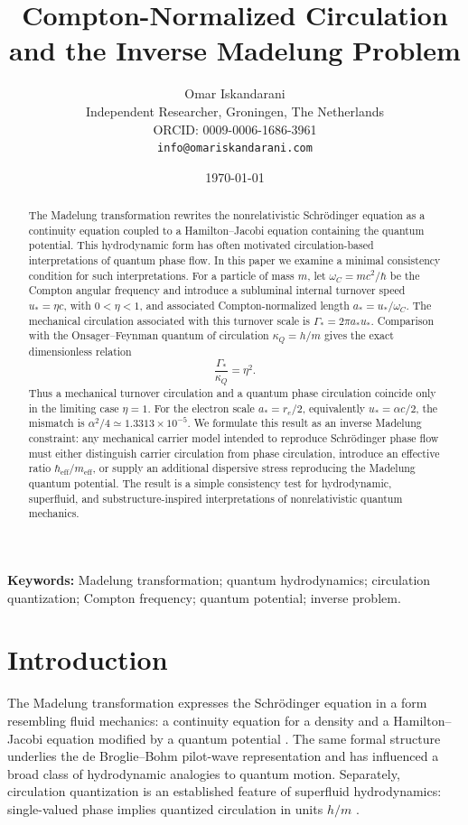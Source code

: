 \documentclass[11pt,a4paper]{article}
\title{\textbf{Compton-Normalized Circulation and the Inverse Madelung Problem}}
\author{Omar Iskandarani\\
\small Independent Researcher, Groningen, The Netherlands\\
\small ORCID: 0009-0006-1686-3961\\
\small \texttt{info@omariskandarani.com}}
\date{\today}
\begin{document}
\maketitle

\begin{abstract}
The Madelung transformation rewrites the nonrelativistic Schr\"odinger equation as a continuity equation coupled to a Hamilton--Jacobi equation containing the quantum potential. This hydrodynamic form has often motivated circulation-based interpretations of quantum phase flow. In this paper we examine a minimal consistency condition for such interpretations. For a particle of mass $m$, let $\omega_C=mc^2/\hbar$ be the Compton angular frequency and introduce a subluminal internal turnover speed $u_* = \eta c$, with $0<\eta<1$, and associated Compton-normalized length $a_* = u_*/\omega_C$. The mechanical circulation associated with this turnover scale is $\Gamma_* = 2\pi a_* u_*$. Comparison with the Onsager--Feynman quantum of circulation $\kappa_Q=h/m$ gives the exact dimensionless relation
\begin{equation*}
    \frac{\Gamma_*}{\kappa_Q}=\eta^2.
\end{equation*}
Thus a mechanical turnover circulation and a quantum phase circulation coincide only in the limiting case $\eta=1$. For the electron scale $a_*=r_e/2$, equivalently $u_* = \alpha c/2$, the mismatch is $\alpha^2/4 \simeq 1.3313\times10^{-5}$. We formulate this result as an inverse Madelung constraint: any mechanical carrier model intended to reproduce Schr\"odinger phase flow must either distinguish carrier circulation from phase circulation, introduce an effective ratio $\hbar_{\mathrm{eff}}/m_{\mathrm{eff}}$, or supply an additional dispersive stress reproducing the Madelung quantum potential. The result is a simple consistency test for hydrodynamic, superfluid, and substructure-inspired interpretations of nonrelativistic quantum mechanics.
\end{abstract}

\noindent\textbf{Keywords:} Madelung transformation; quantum hydrodynamics; circulation quantization; Compton frequency; quantum potential; inverse problem.

\section{Introduction}

The Madelung transformation expresses the Schr\"odinger equation in a form resembling fluid mechanics: a continuity equation for a density and a Hamilton--Jacobi equation modified by a quantum potential \cite{Madelung1927,Schrodinger1926,Takabayasi1952,Holland1993}. The same formal structure underlies the de Broglie--Bohm pilot-wave representation \cite{Bohm1952a,Bohm1952b} and has influenced a broad class of hydrodynamic analogies to quantum motion. Separately, circulation quantization is an established feature of superfluid hydrodynamics: single-valued phase implies quantized circulation in units $h/m$ \cite{Onsager1949,Feynman1955,Donnelly1991}. 
\end{document}
